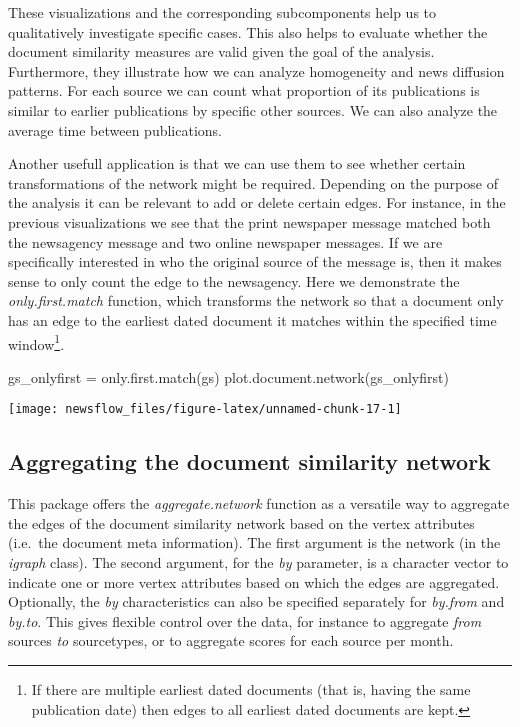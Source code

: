 These visualizations and the corresponding subcomponents help us to
qualitatively investigate specific cases. This also helps to evaluate
whether the document similarity measures are valid given the goal of the
analysis. Furthermore, they illustrate how we can analyze homogeneity
and news diffusion patterns. For each source we can count what
proportion of its publications is similar to earlier publications by
specific other sources. We can also analyze the average time between
publications.

Another usefull application is that we can use them to see whether
certain transformations of the network might be required. Depending on
the purpose of the analysis it can be relevant to add or delete certain
edges. For instance, in the previous visualizations we see that the
print newspaper message matched both the newsagency message and two
online newspaper messages. If we are specifically interested in who the
original source of the message is, then it makes sense to only count the
edge to the newsagency. Here we demonstrate the \emph{only.first.match}
function, which transforms the network so that a document only has an
edge to the earliest dated document it matches within the specified time
window\footnote{If there are multiple earliest dated documents (that is,
  having the same publication date) then edges to all earliest dated
  documents are kept.}.

\begin{Schunk}
\begin{Sinput}
gs_onlyfirst = only.first.match(gs)
plot.document.network(gs_onlyfirst)
\end{Sinput}

\texttt{[image: newsflow\_files/figure-latex/unnamed-chunk-17-1]} \end{Schunk}

\subsection{Aggregating the document similarity network}

This package offers the \emph{aggregate.network} function as a versatile
way to aggregate the edges of the document similarity network based on
the vertex attributes (i.e.~the document meta information). The first
argument is the network (in the \emph{igraph} class). The second
argument, for the \emph{by} parameter, is a character vector to indicate
one or more vertex attributes based on which the edges are aggregated.
Optionally, the \emph{by} characteristics can also be specified
separately for \emph{by.from} and \emph{by.to}. This gives flexible
control over the data, for instance to aggregate \emph{from} sources
\emph{to} sourcetypes, or to aggregate scores for each source per month.

